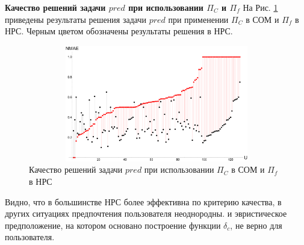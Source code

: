 {\bf Качество решений задачи $pred$ при использовании $\Pi_C$ и $\Pi_f$}
На Рис. \ref{pic:pred_pio_pif} приведены результаты решения
задачи $pred$ при применении $\Pi_C$ в СОМ и $\Pi_f$ в НРС.
Черным цветом обозначены результаты решения в НРС.

\begin{figure}[H]
	\caption{Качество решений задачи $pred$ при использовании $\Pi_C$ в СОМ и
	$\Pi_f$ в НРС}
	\label{pic:pred_pio_pif}
	\begin{center}
		\includegraphics[width=5in,height=2in]{pics/results/ub_vs_fuzzy.pdf}
\end{center}
\end{figure}
Видно, что в большинстве НРС более эффективна по критерию качества,
в других ситуациях предпочтения пользователя неоднородны.
и эвристическое предположение, на котором основано построение
функции $\delta_c$, не верно для пользователя.

%



